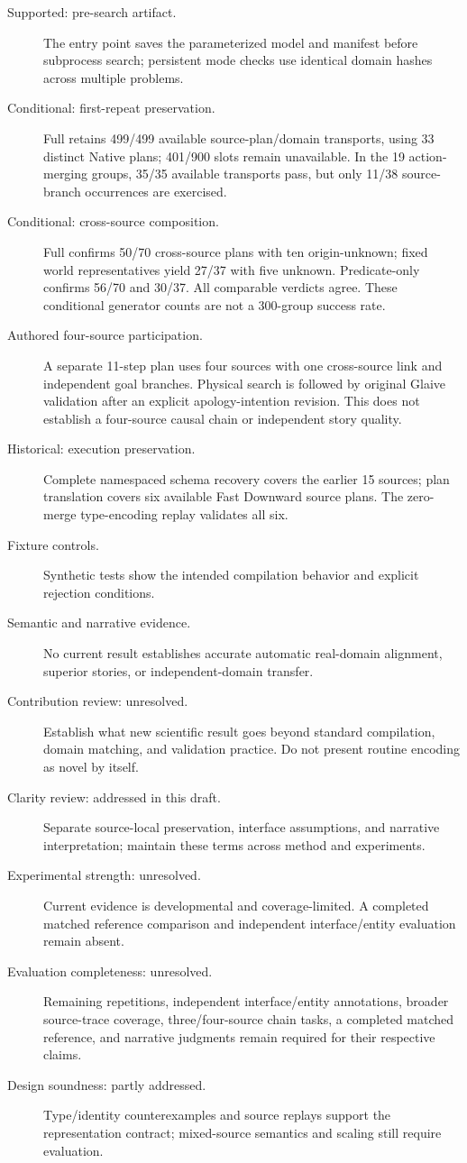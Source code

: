 \documentclass[letterpaper]{article}
\begin{document}
\begin{description}
\item[Supported: pre-search artifact.] The entry point saves the parameterized model and manifest before subprocess search; persistent mode checks use identical domain hashes across multiple problems.
\item[Conditional: first-repeat preservation.] Full retains 499/499 available source-plan/domain transports, using 33 distinct Native plans; 401/900 slots remain unavailable. In the 19 action-merging groups, 35/35 available transports pass, but only 11/38 source-branch occurrences are exercised.
\item[Conditional: cross-source composition.] Full confirms 50/70 cross-source plans with ten origin-unknown; fixed world representatives yield 27/37 with five unknown. Predicate-only confirms 56/70 and 30/37. All comparable verdicts agree. These conditional generator counts are not a 300-group success rate.
\item[Authored four-source participation.] A separate 11-step plan uses four sources with one cross-source link and independent goal branches. Physical search is followed by original Glaive validation after an explicit apology-intention revision. This does not establish a four-source causal chain or independent story quality.
\item[Historical: execution preservation.] Complete namespaced schema recovery covers the earlier 15 sources; plan translation covers six available Fast Downward source plans. The zero-merge type-encoding replay validates all six.
\item[Fixture controls.] Synthetic tests show the intended compilation behavior and explicit rejection conditions.
\item[Semantic and narrative evidence.] No current result establishes accurate automatic real-domain alignment, superior stories, or independent-domain transfer.
\item[Contribution review: unresolved.] Establish what new scientific result goes beyond standard compilation, domain matching, and validation practice. Do not present routine encoding as novel by itself.
\item[Clarity review: addressed in this draft.] Separate source-local preservation, interface assumptions, and narrative interpretation; maintain these terms across method and experiments.
\item[Experimental strength: unresolved.] Current evidence is developmental and coverage-limited. A completed matched reference comparison and independent interface/entity evaluation remain absent.
\item[Evaluation completeness: unresolved.] Remaining repetitions, independent interface/entity annotations, broader source-trace coverage, three/four-source chain tasks, a completed matched reference, and narrative judgments remain required for their respective claims.
\item[Design soundness: partly addressed.] Type/identity counterexamples and source replays support the representation contract; mixed-source semantics and scaling still require evaluation.
\end{description}


\end{document}
